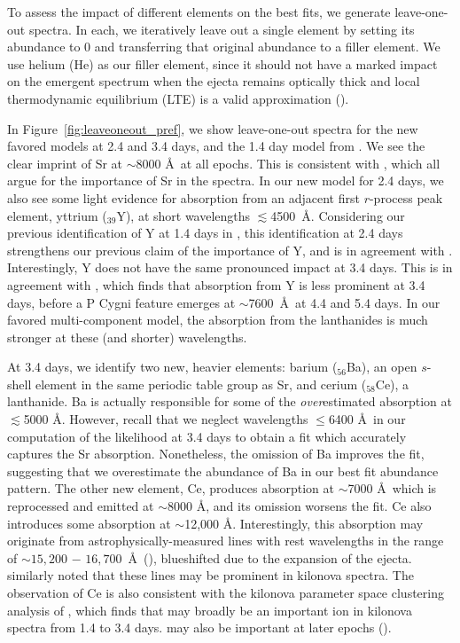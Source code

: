 \documentclass[twocolumn,twocolappendix]{aastex63}
\def\V23{\citetalias{vieira23}}
\begin{document}
To assess the impact of different elements on the best fits, we generate leave-one-out spectra. In each, we iteratively leave out a single element by setting its abundance to 0 and transferring that original abundance to a filler element. We use helium (He) as our filler element, since it should not have a marked impact on the emergent spectrum when the ejecta remains optically thick and local thermodynamic equilibrium (LTE) is a valid approximation (\citealt{perego22, tarumi23}).

In Figure~\ref{fig:leaveoneout_pref}, we show leave-one-out spectra for the new favored models at 2.4 and 3.4 days, and the 1.4 day model from \V23. We see the clear imprint of Sr at $\sim$8000 \AA~at all epochs. This is consistent with \cite{watson19, gillanders22, domoto21, domoto22, sneppen23, sneppenwatson23}, which all argue for the importance of Sr in the spectra. In our new model for 2.4 days, we also see some light evidence for absorption from an adjacent first $r$-process peak element, yttrium (${}_{39}$Y), at short wavelengths $\lesssim$4500~\AA. Considering our previous identification of Y at 1.4 days in \V23, this identification at 2.4 days strengthens our previous claim of the importance of Y, and is in agreement with \cite{gillanders22}. Interestingly, Y does not have the same pronounced impact at 3.4 days. This is in agreement with \cite{sneppenwatson23}, which finds that absorption from Y is less prominent at 3.4 days, before a P Cygni feature emerges at $\sim$7600~\AA~at 4.4 and 5.4 days. In our favored multi-component model, the absorption from the lanthanides is much stronger at these (and shorter) wavelengths. 

At 3.4 days, we identify two new, heavier elements: barium (${}_{56}$Ba), an open $s$-shell element in the same periodic table group as Sr, and cerium (${}_{58}$Ce), a lanthanide. Ba is actually responsible for some of the \textit{over}estimated absorption at $\lesssim$5000 \AA. However, recall that we neglect wavelengths $\leqslant$6400 \AA~in our computation of the likelihood at 3.4 days to obtain a fit which accurately captures the Sr absorption. Nonetheless, the omission of Ba improves the fit, suggesting that we overestimate the abundance of Ba in our best fit abundance pattern. The other new element, Ce, produces absorption at $\sim$7000 \AA~which is reprocessed and emitted at $\sim$8000 \AA, and its omission worsens the fit. Ce also introduces some absorption at $\sim$12,000 \AA. Interestingly, this absorption may originate from astrophysically-measured  lines with rest wavelengths in the range of $\sim$$15,200$ $-$ $16,700$~\AA~(\citealt{cunha17, majewski17}), blueshifted due to the expansion of the ejecta. \cite{domoto21} similarly noted that these  lines may be prominent in kilonova spectra. The observation of Ce is also consistent with the kilonova parameter space clustering analysis of \cite{ford23}, which finds that  may broadly be an important ion in kilonova spectra from 1.4 to 3.4 days.  may also be important at later epochs (\citealt{gillanders23}). 
\end{document}
